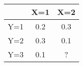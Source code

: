 \begin{tabular}[12pt]{|c|c|c|}
\hline

 & X=1 & X=2 \\ \hline
Y=1 & 0.2 & 0.3 \\ \hline
Y=2 & 0.3 & 0.1 \\  \hline
Y=3 & 0.1 & ? \\ \hline 
\end{tabular}
